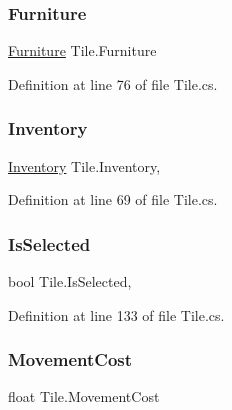 \subsubsection{\texorpdfstring{Furniture}{Furniture}}
{\footnotesize\ttfamily \hyperlink{class_furniture}{Furniture} Tile.\+Furniture\hspace{0.3cm}{\ttfamily [get]}}



Definition at line 76 of file Tile.\+cs.

\mbox{\label{class_tile_a686d7969d77a7370c913d9980d264cd8}} 
\subsubsection{\texorpdfstring{Inventory}{Inventory}}
{\footnotesize\ttfamily \hyperlink{class_inventory}{Inventory} Tile.\+Inventory\hspace{0.3cm}{\ttfamily [get]}, {\ttfamily [set]}}



Definition at line 69 of file Tile.\+cs.

\mbox{\label{class_tile_a29b80ed6a151b7613b9e903d046bdb1e}} 
\subsubsection{\texorpdfstring{Is\+Selected}{IsSelected}}
{\footnotesize\ttfamily bool Tile.\+Is\+Selected\hspace{0.3cm}{\ttfamily [get]}, {\ttfamily [set]}}



Definition at line 133 of file Tile.\+cs.

\mbox{\label{class_tile_a0711fb028d7d558334c3bc57ebd49e80}} 
\subsubsection{\texorpdfstring{Movement\+Cost}{MovementCost}}
{\footnotesize\ttfamily float Tile.\+Movement\+Cost\hspace{0.3cm}{\ttfamily [get]}}



